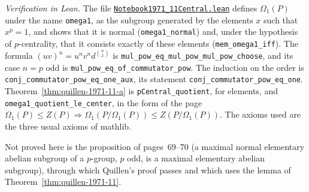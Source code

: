 \emph{Verification in Lean.} The file \href{\leanblobmain/Notebook1971_11Central.lean}{\texttt{Notebook1971\_11Central.\allowbreak{}lean}} defines $\Omega_1(P)$ under the name \texttt{omega1}, as the subgroup generated by the elements $x$ such that $x^p = 1$, and shows that it is normal (\texttt{omega1\_normal}) and, under the hypothesis of $p$-centrality, that it consists exactly of these elements (\texttt{mem\_omega1\_iff}). The formula $(uv)^n = u^n v^n d^{\binom n2}$ is \texttt{mul\_pow\_eq\_mul\_pow\_mul\_pow\_choose}, and its case $n = p$ odd is \texttt{mul\_pow\_eq\_of\_commutator\_pow}. The induction on the order is \texttt{conj\_commutator\_pow\_eq\_one\_aux}, its statement \texttt{conj\_commutator\_pow\_eq\_one}. Theorem~\ref{thm:quillen-1971-11-a} is \texttt{pCentral\_quotient}, for elements, and \texttt{omega1\_quotient\_le\_center}, in the form of the page $\Omega_1(P) \le Z(P) \Rightarrow \Omega_1(P/\Omega_1(P)) \le Z(P/\Omega_1(P))$. The axioms used are the three usual axioms of mathlib.

Not proved here is the proposition of pages~69--70 (a maximal normal elementary abelian subgroup of a $p$-group, $p$ odd, is a maximal elementary abelian subgroup), through which Quillen's proof passes and which uses the lemma of Theorem~\ref{thm:quillen-1971-11}.


